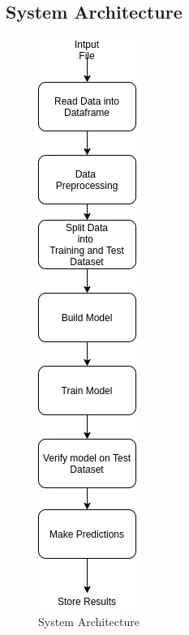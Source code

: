 \documentclass[a4paper, 12pt]{article}
\begin{document}
\newpage
\begin{center}
    \section{System Architecture}
\end{center}
\par
\begin{figure}[h]
    \centering
    \includegraphics[scale=0.71]{DA-SA.jpg}
    \caption{System Architecture}
\end{figure}


\end{document}
